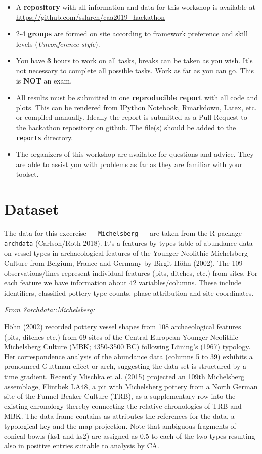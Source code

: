 \documentclass[a3, ruledsections, 8pt]{sciposter}
\begin{document}
\begin{itemize}
\item A \textbf{repository} with all information and data for this workshop is available at \newline \url{https://github.com/sslarch/caa2019_hackathon}
\item 2-4 \textbf {groups} are formed on site according to framework preference and skill levels (\textit{Unconference style}).
\item You have \textbf{3} hours to work on all tasks, breaks can be taken as you wish. It's not necessary to complete all possible tasks. Work as far as you can go. This is \textbf{NOT} an exam.
\item All results must be submitted in one \textbf{reproducible report} with all code and plots. This can be rendered from IPython Notebook, Rmarkdown, Latex, etc. or compiled manually. Ideally the report is submitted as a Pull Request to the hackathon repository on github. The file(s) should be added to the \verb|reports| directory.
\item The organizers of this workshop are available for questions and advice. They are able to assist you with problems as far as they are familiar with your toolset.
\end{itemize}

\section{Dataset}

The data for this excercise --- \verb|Michelsberg| --- are taken from the R package \verb|archdata| (Carlson/Roth 2018). It's a features by types table of abundance data on vessel types in archaeological features of the Younger Neolithic Michelsberg Culture from Belgium, France and Germany by Birgit Höhn (2002). The 109 observations/lines represent individual features (pits, ditches, etc.) from sites. For each feature we have information about 42 variables/columns. These include identifiers, classified pottery type counts, phase attribution and site coordinates.

\bigskip

\textit{From ?archdata::Michelsberg:}

Höhn (2002) recorded pottery vessel shapes from 108 archaeological features (pits, ditches etc.) from 69 sites of the Central European Younger Neolithic Michelsberg Culture (MBK; 4350-3500 BC) following Lüning's (1967) typology. Her correspondence analysis of the abundance data (columns 5 to 39) exhibits a pronounced Guttman effect or arch, suggesting the data set is structured by a time gradient. Recently Mischka et al. (2015) projected an 109th Michelsberg assemblage, Flintbek LA48, a pit with Michelsberg pottery from a North German site of the Funnel Beaker Culture (TRB), as a supplementary row into the existing chronology thereby connecting the relative chronologies of TRB and MBK. The data frame contains as attributes the references for the data, a typological key and the map projection. Note that ambiguous fragments of conical bowls (ks1 and ks2) are assigned as 0.5 to each of the two types resulting also in positive entries suitable to analysis by CA.
\end{document}
